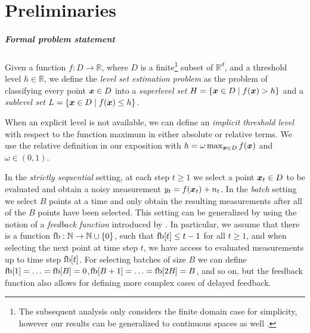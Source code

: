 \chapter{Preliminaries} \label{ch:prelim}

\paragraph{Formal problem statement}
Given a function ${f : D \to \mathbb{R}}$, where $D$ is a
finite\footnote{The subsequent analysis only considers the finite domain case
for simplicity, however our results can be generalized to continuous spaces
as well \citep[cf.][]{srinivas10}.}
subset of $\mathbb{R}^d$, and a threshold level ${h \in \mathbb{R}}$,
we define the \emph{level set estimation problem} as the problem of classifying
every point $\bm{x} \in D$ into a \emph{superlevel set}
$H = \{\bm{x} \in D \mid f(\bm{x}) > h\}$ and a \emph{sublevel set}
${L = \{\bm{x} \in D \mid f(\bm{x}) \leq h\}}$.

When an explicit level is not available, we can define an
\emph{implicit threshold level}
with respect to the function maximum in either absolute or relative terms.
We use the relative definition in our exposition with
${h = \omega \max_{\bm{x}\in D} f(\bm{x})}$
and $\omega \in (0, 1)$.

In the \emph{strictly sequential} setting,
at each step $t \geq 1$ we select a point $\bm{x}_t \in D$ to be evaluated and
obtain a noisy measurement $y_t = f(\bm{x}_t) + n_t$.
In the \emph{batch} setting we select $B$ points at a time and only obtain
the resulting measurements after all of the $B$ points have been selected.
This setting can be generalized by using the notion of a
\emph{feedback function} introduced by \citet{desautels12}.
In particular, we assume that there is a function
${\mathop{\mathrm{fb}} : \mathbb{N} \to \mathbb{N}\cup\{0\}}$, such that
$\mathop{\mathrm{fb}}[t] \leq t-1$ for all $t \geq 1$, and when selecting the next point
at time step $t$, we have access to evaluated measurements up to
time step $\mathop{\mathrm{fb}}[t]$. For selecting batches of size $B$ we can define
$\mathop{\mathrm{fb}}[1] = \ldots = \mathop{\mathrm{fb}}[B] = 0$,\enskip$\mathop{\mathrm{fb}}[B+1] = \ldots = \mathop{\mathrm{fb}}[2B] = B$,
and so on,
but the feedback function also allows for defining more complex cases
of delayed feedback.


